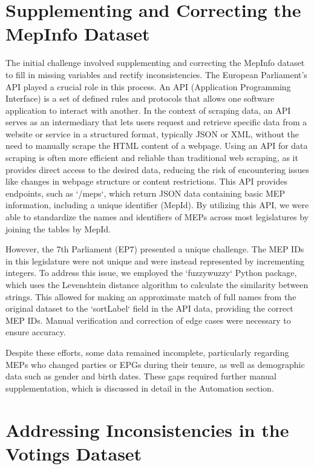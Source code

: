 \documentclass{report}
\begin{document}
    \section{Supplementing and Correcting the MepInfo Dataset}


    The initial challenge involved supplementing and correcting the MepInfo dataset to fill in missing variables
    and
    rectify inconsistencies. The European Parliament's API played a crucial role in this process. An API
    (Application
    Programming Interface) is a set of defined rules and protocols that allows one software application to
    interact with
    another. In the context of scraping data, an API serves as an intermediary that lets users request and
    retrieve
    specific data from a website or service in a structured format, typically JSON or XML, without the need to
    manually
    scrape the HTML content of a webpage.
    Using an API for data scraping is often more efficient and reliable than traditional web scraping, as it
    provides
    direct access to the desired data, reducing the risk of encountering issues like changes in webpage
    structure or
    content restrictions. This API provides endpoints, such as `/meps`, which return JSON data containing basic
    MEP
    information, including a unique identifier (MepId). By utilizing this API, we were able to standardize the
    names and
    identifiers of MEPs across most legislatures by joining the tables by MepId.

    However, the 7th Parliament (EP7) presented a unique challenge. The MEP IDs in this legislature were not
    unique and
    were instead represented by incrementing integers. To address this issue, we employed the `fuzzywuzzy`
    Python
    package, which uses the Levenshtein distance algorithm to calculate the similarity between strings. This
    allowed for
    making an approximate match of full names from the original dataset to the `sortLabel` field in the API
    data,
    providing the correct MEP IDs. Manual verification and correction of edge cases were necessary to ensure
    accuracy.

    Despite these efforts, some data remained incomplete, particularly regarding MEPs who changed parties or
    EPGs during
    their tenure, as well as demographic data such as gender and birth dates. These gaps required further manual
    supplementation, which is discussed in detail in the Automation section.


    \section{Addressing Inconsistencies in the Votings Dataset}
\end{document}
